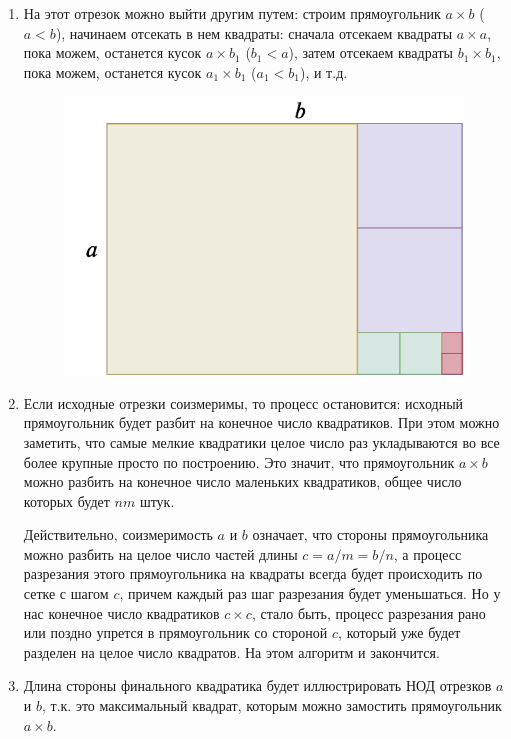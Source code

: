 \begin{enumerate}
\item На этот отрезок можно выйти другим путем: строим прямоугольник $a\times b$ ($a<b$), начинаем отсекать в нем квадраты: сначала отсекаем квадраты $a\times a$, пока можем, останется кусок $a\times b_1$ ($b_1<a$), затем отсекаем квадраты $b_1\times b_1$, пока можем, останется кусок $a_1\times b_1$ ($a_1<b_1$), и т.д.
\begin{figure}[hbt!]
\begin{center}
\includegraphics[scale=0.3]{soizmer.png}
\end{center}
\caption{}\label{soizmer}
\end{figure}

\item Если исходные отрезки соизмеримы, то процесс остановится: исходный прямоугольник будет разбит на конечное число квадратиков. При этом можно заметить, что самые мелкие квадратики целое число раз укладываются во все более крупные просто по построению. Это значит, что прямоугольник $a\times b$ можно разбить на конечное число маленьких квадратиков, общее число которых будет $nm$ штук.

Действительно, соизмеримость $a$ и $b$ означает, что стороны прямоугольника можно разбить на целое число частей длины $c=a/m=b/n$, а процесс разрезания этого прямоугольника на квадраты всегда будет происходить по сетке с шагом $c$, причем каждый раз шаг разрезания будет уменьшаться. Но у нас конечное число квадратиков $c\times c$, стало быть, процесс разрезания рано или поздно упрется в прямоугольник со стороной $c$, который уже будет разделен на целое число квадратов. На этом алгоритм и закончится.

\item Длина стороны финального квадратика будет иллюстрировать НОД отрезков $a$ и $b$, т.к. это максимальный квадрат, которым можно замостить прямоугольник $a\times b$. 


\end{enumerate}
